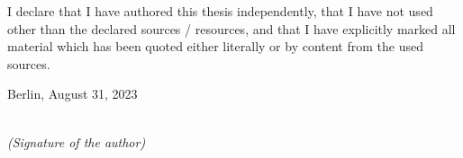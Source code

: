 \newpage
\thispagestyle{empty}

\begin{large}

\vspace*{2cm}

\noindent
I declare that I have authored this thesis independently, that I have not used other than the declared sources / resources, and that I have explicitly marked all material which has been quoted either literally or by content from the used sources.

\vspace{2cm}

\noindent
Berlin, August 31, 2023
\vspace{3cm}

\hspace*{7cm}%
\dotfill\\
\hspace*{8.5cm}%
\textit{(Signature of the author)}

\end{large}
